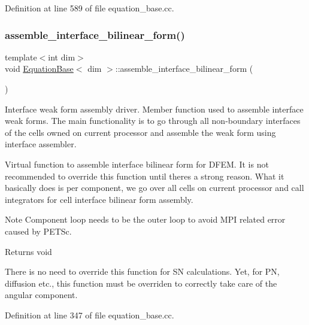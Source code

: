 Definition at line 589 of file equation\+\_\+base.\+cc.

\mbox{\label{class_equation_base_ac590b2065d95ea03fcf411c965e6cfd9}} 
\subsubsection{\texorpdfstring{assemble\+\_\+interface\+\_\+bilinear\+\_\+form()}{assemble\_interface\_bilinear\_form()}}
{\footnotesize\ttfamily template$<$int dim$>$ \\
void \hyperlink{class_equation_base}{Equation\+Base}$<$ dim $>$\+::assemble\+\_\+interface\+\_\+bilinear\+\_\+form (\begin{DoxyParamCaption}{ }\end{DoxyParamCaption})\hspace{0.3cm}{\ttfamily [virtual]}}



Interface weak form assembly driver. Member function used to assemble interface weak forms. The main functionality is to go through all non-\/boundary interfaces of the cells owned on current processor and assemble the weak form using interface assembler. 

Virtual function to assemble interface bilinear form for D\+F\+EM. It is not recommended to override this function until there\textquotesingle{}s a strong reason. What it basically does is per component, we go over all cells on current processor and call integrators for cell interface bilinear form assembly.

\begin{DoxyNote}{Note}
Component loop needs to be the outer loop to avoid M\+PI related error caused by P\+E\+T\+Sc.
\end{DoxyNote}
\begin{DoxyReturn}{Returns}
void
\end{DoxyReturn}
There is no need to override this function for SN calculations. Yet, for PN, diffusion etc., this function must be overriden to correctly take care of the angular component. 

Definition at line 347 of file equation\+\_\+base.\+cc.

\mbox{\label{class_equation_base_ac08c0b8c03ccd29f0b9eb49f6e63f8e9}} 
